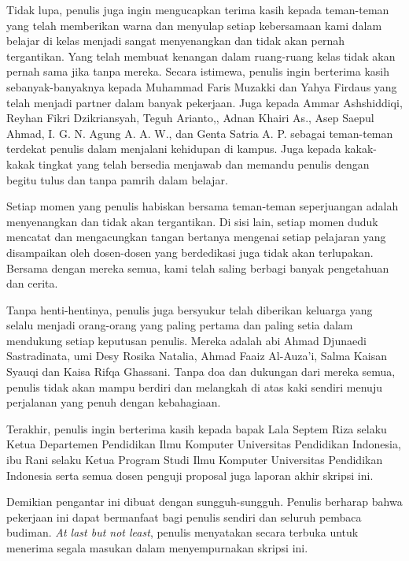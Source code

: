 \documentclass{kti}
\begin{document}
{Tidak lupa, penulis juga ingin mengucapkan terima kasih kepada teman-teman yang telah memberikan warna dan menyulap setiap kebersamaan kami dalam belajar di kelas menjadi sangat menyenangkan dan tidak akan pernah tergantikan. Yang telah membuat kenangan dalam ruang-ruang kelas tidak akan pernah sama jika tanpa mereka. Secara istimewa, penulis ingin berterima kasih sebanyak-banyaknya kepada Muhammad Faris Muzakki dan Yahya Firdaus yang telah menjadi partner dalam banyak pekerjaan. Juga kepada Ammar Ashshiddiqi, Reyhan Fikri Dzikriansyah, Teguh Arianto,, Adnan Khairi As., Asep Saepul Ahmad, I. G. N. Agung A. A. W., dan Genta Satria A. P. sebagai teman-teman terdekat penulis dalam menjalani kehidupan di kampus. Juga kepada kakak-kakak tingkat yang telah bersedia menjawab dan memandu penulis dengan begitu tulus dan tanpa pamrih dalam belajar.

Setiap momen yang penulis habiskan bersama teman-teman seperjuangan adalah menyenangkan dan tidak akan tergantikan. Di sisi lain, setiap momen duduk mencatat dan mengacungkan tangan bertanya mengenai setiap pelajaran yang disampaikan oleh dosen-dosen yang berdedikasi juga tidak akan terlupakan. Bersama dengan mereka semua, kami telah saling berbagi banyak pengetahuan dan cerita.

Tanpa henti-hentinya, penulis juga bersyukur telah diberikan keluarga yang selalu menjadi orang-orang yang paling pertama dan paling setia dalam mendukung setiap keputusan penulis. Mereka adalah abi Ahmad Djunaedi Sastradinata, umi Desy Rosika Natalia, Ahmad Faaiz Al-Auza'i, Salma Kaisan Syauqi dan Kaisa Rifqa Ghassani. Tanpa doa dan dukungan dari mereka semua, penulis tidak akan mampu berdiri dan melangkah di atas kaki sendiri menuju perjalanan yang penuh dengan kebahagiaan.

Terakhir, penulis ingin berterima kasih kepada bapak Lala Septem Riza selaku Ketua Departemen Pendidikan Ilmu Komputer Universitas Pendidikan Indonesia, ibu Rani selaku Ketua Program Studi Ilmu Komputer Universitas Pendidikan Indonesia serta semua dosen penguji proposal juga laporan akhir skripsi ini.

Demikian pengantar ini dibuat dengan sungguh-sungguh. Penulis berharap bahwa pekerjaan ini dapat bermanfaat bagi penulis sendiri dan seluruh pembaca budiman. \textit{At last but not least}, penulis menyatakan secara terbuka untuk menerima segala masukan dalam menyempurnakan skripsi ini.}
\preface
\end{document}
